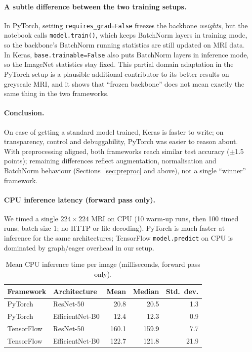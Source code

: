 \documentclass[11pt,a4paper]{article}
\begin{document}
\paragraph{A subtle difference between the two training setups.}
In PyTorch, setting \texttt{requires\_grad=False} freezes the backbone \emph{weights}, but the notebook calls \texttt{model.train()}, which keeps BatchNorm layers in training mode, so the backbone's BatchNorm running statistics are still updated on MRI data. In Keras, \texttt{base.trainable=False} also puts BatchNorm layers in inference mode, so the ImageNet statistics stay fixed. This partial domain adaptation in the PyTorch setup is a plausible additional contributor to its better results on greyscale MRI, and it shows that ``frozen backbone'' does not mean exactly the same thing in the two frameworks.

\paragraph{Conclusion.}
On ease of getting a standard model trained, Keras is faster to write; on transparency, control and debuggability, PyTorch was easier to reason about. With preprocessing aligned, both frameworks reach similar test accuracy ($\pm$1.5 points); remaining differences reflect augmentation, normalisation and BatchNorm behaviour (Sections~\ref{sec:preproc} and above), not a single ``winner'' framework.

\paragraph{CPU inference latency (forward pass only).}
We timed a single $224\times224$ MRI on CPU (10 warm-up runs, then 100 timed runs; batch size 1; no HTTP or file decoding). PyTorch is much faster at inference for the same architectures; TensorFlow \texttt{model.predict} on CPU is dominated by graph/eager overhead in our setup.

\begin{table}[H]
\centering
\caption{Mean CPU inference time per image (milliseconds, forward pass only).}
\label{tab:inference}
\begin{tabular}{llrrr}
\toprule
Framework & Architecture & Mean & Median & Std.\ dev. \\
\midrule
PyTorch    & ResNet-50       & 20.8 & 20.5 & 1.3 \\
PyTorch    & EfficientNet-B0 & 12.4 & 12.3 & 0.9 \\
TensorFlow & ResNet-50       & 160.1 & 159.9 & 7.7 \\
TensorFlow & EfficientNet-B0 & 122.7 & 121.8 & 21.9 \\
\bottomrule
\end{tabular}
\end{table}
\end{document}
